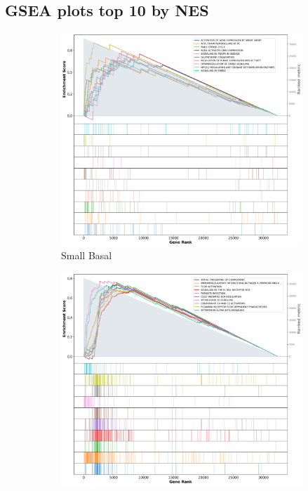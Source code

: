 \subsection{GSEA plots top 10 by NES}
\begin{figure}[!h]
    \captionsetup[subfigure]{justification=centering}
    \centering
    \begin{subfigure}[!t]{0.4\textwidth}
        \centering
        \includegraphics[width=\textwidth,keepaspectratio]{Sections/Network_I/Resources/selective_pruning/gsea/smallBasal_10_top_manTerms.png}
        \caption{Small Basal}
        \label{fig:ap:gsea_smallBasal}
    \end{subfigure}
    \begin{subfigure}[!t]{0.4\textwidth}
        \centering
        \includegraphics[width=\textwidth,keepaspectratio]{Sections/Network_I/Resources/selective_pruning/gsea/largeBasal_10_top_manTerms.png}

\end{subfigure}
\end{figure}
